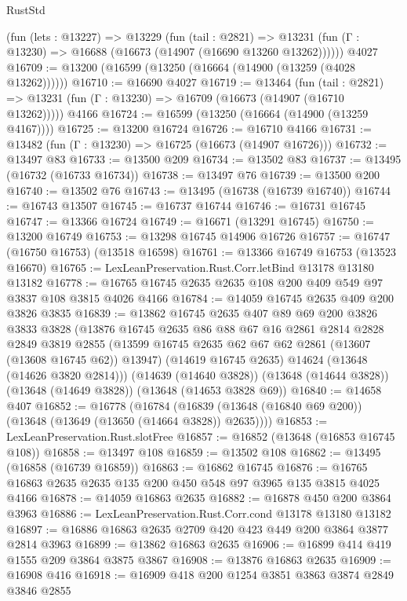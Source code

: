 \begin{lexlean}{RustStd}
\begin{coremodule}
    (fun (lets : @13227) =>
    @13229
      (fun (tail : @2821) =>
      @13231 (fun (Γ : @13230) => @16688 (@16673 (@14907 (@16690 @13260 @13262))))))
    @4027
@16709 := @13200 (@16599 (@13250 (@16664 (@14900 (@13259 (@4028 @13262))))))
@16710 := @16690 @4027
@16719 := @13464
    (fun (tail : @2821) => @13231 (fun (Γ : @13230) => @16709 (@16673 (@14907 (@16710 @13262)))))
    @4166
@16724 := @16599 (@13250 (@16664 (@14900 (@13259 @4167))))
@16725 := @13200 @16724
@16726 := @16710 @4166
@16731 := @13482 (fun (Γ : @13230) => @16725 (@16673 (@14907 @16726)))
@16732 := @13497 @83
@16733 := @13500 @209
@16734 := @13502 @83
@16737 := @13495 (@16732 (@16733 @16734))
@16738 := @13497 @76
@16739 := @13500 @200
@16740 := @13502 @76
@16743 := @13495 (@16738 (@16739 @16740))
@16744 := @16743 @13507
@16745 := @16737 @16744
@16746 := @16731 @16745
@16747 := @13366 @16724
@16749 := @16671 (@13291 @16745)
@16750 := @13200 @16749
@16753 := @13298 @16745 @14906 @16726
@16757 := @16747 (@16750 @16753) (@13518 @16598)
@16761 := @13366 @16749 @16753 (@13523 @16670)
@16765 := LexLeanPreservation.Rust.Corr.letBind @13178 @13180 @13182
@16778 := @16765 @16745 @2635 @2635 @108 @200 @409 @549 @97 @3837 @108 @3815 @4026 @4166
@16784 := @14059 @16745 @2635 @409 @200 @3826 @3835
@16839 := @13862
    @16745
    @2635
    @407
    @89
    @69
    @200
    @3826
    @3833
    @3828
    (@13876
      @16745
      @2635
      @86
      @88
      @67
      @16
      @2861
      @2814
      @2828
      @2849
      @3819
      @2855
      (@13599 @16745 @2635 @62 @67 @62 @2861 (@13607 (@13608 @16745 @62)) @13947)
      (@14619 @16745 @2635)
      @14624
      (@13648 (@14626 @3820 @2814)))
    (@14639 (@14640 @3828))
    (@13648 (@14644 @3828))
    (@13648 (@14649 @3828))
    (@13648 (@14653 @3828 @69))
@16840 := @14658 @407
@16852 := @16778
    (@16784 (@16839 (@13648 (@16840 @69 @200)) (@13648 (@13649 (@13650 (@14664 @3828)) @2635))))
@16853 := LexLeanPreservation.Rust.slotFree
@16857 := @16852 (@13648 (@16853 @16745 @108))
@16858 := @13497 @108
@16859 := @13502 @108
@16862 := @13495 (@16858 (@16739 @16859))
@16863 := @16862 @16745
@16876 := @16765 @16863 @2635 @2635 @135 @200 @450 @548 @97 @3965 @135 @3815 @4025 @4166
@16878 := @14059 @16863 @2635
@16882 := @16878 @450 @200 @3864 @3963
@16886 := LexLeanPreservation.Rust.Corr.cond @13178 @13180 @13182
@16897 := @16886 @16863 @2635 @2709 @420 @423 @449 @200 @3864 @3877 @2814 @3963
@16899 := @13862 @16863 @2635
@16906 := @16899 @414 @419 @1555 @209 @3864 @3875 @3867
@16908 := @13876 @16863 @2635
@16909 := @16908 @416
@16918 := @16909 @418 @200 @1254 @3851 @3863 @3874 @2849 @3846 @2855

\end{coremodule}
\end{lexlean}
